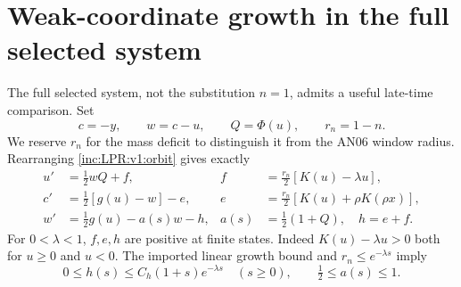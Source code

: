 \documentclass[11pt]{article}
\numberwithin{equation}{section}
\theoremstyle{remark}\newtheorem{remark}[theorem]{Remark}
\begin{document}
\section{Weak-coordinate growth in the full selected system}
\label{inc:LPR:v1:weakgrowth}
The full selected system, not the substitution $n=1$, admits a useful
late-time comparison. Set
\[
 c=-y,\qquad w=c-u,\qquad Q=\Phi(u),\qquad r_n=1-n.
\]
We reserve $r_n$ for the mass deficit to distinguish it from the AN06
window radius. Rearranging \eqref{inc:LPR:v1:orbit} gives exactly
\begin{align}
 u'&=\tfrac12wQ+f, &
 f&=\tfrac{r_n}{2}[K(u)-\lambda u],\nonumber\\
 c'&=\tfrac12[g(u)-w]-e, &
 e&=\tfrac{r_n}{2}[K(u)+\rho K(\rho x)],\nonumber\\
 w'&=\tfrac12g(u)-a(s)w-h, &
 a(s)&=\tfrac12(1+Q),\quad h=e+f.
 \label{inc:LPR:v1:weakpair}
\end{align}
For $0<\lambda<1$, $f,e,h$ are positive at finite states. Indeed
$K(u)-\lambda u>0$ both for $u\ge0$ and $u<0$.
The imported linear growth bound and $r_n\le e^{-\lambda s}$ imply
\begin{equation}\label{inc:LPR:v1:weakforcing}
 0\le h(s)\le C_h(1+s)e^{-\lambda s}\quad(s\ge0),
 \qquad \tfrac12\le a(s)\le1.
\end{equation}
\end{document}
